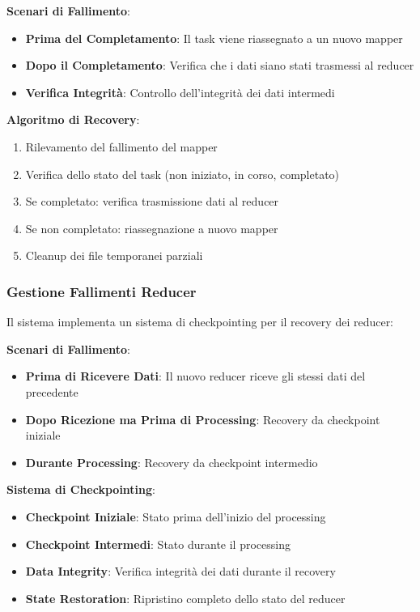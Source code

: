 \documentclass[12pt,a4paper]{article}
\begin{document}
\textbf{Scenari di Fallimento}:
\begin{itemize}
\item \textbf{Prima del Completamento}: Il task viene riassegnato a un nuovo mapper
\item \textbf{Dopo il Completamento}: Verifica che i dati siano stati trasmessi al reducer
\item \textbf{Verifica Integrità}: Controllo dell'integrità dei dati intermedi
\end{itemize}

\textbf{Algoritmo di Recovery}:
\begin{enumerate}
\item Rilevamento del fallimento del mapper
\item Verifica dello stato del task (non iniziato, in corso, completato)
\item Se completato: verifica trasmissione dati al reducer
\item Se non completato: riassegnazione a nuovo mapper
\item Cleanup dei file temporanei parziali
\end{enumerate}

\subsubsection{Gestione Fallimenti Reducer}

Il sistema implementa un sistema di checkpointing per il recovery dei reducer:

\textbf{Scenari di Fallimento}:
\begin{itemize}
\item \textbf{Prima di Ricevere Dati}: Il nuovo reducer riceve gli stessi dati del precedente
\item \textbf{Dopo Ricezione ma Prima di Processing}: Recovery da checkpoint iniziale
\item \textbf{Durante Processing}: Recovery da checkpoint intermedio
\end{itemize}

\textbf{Sistema di Checkpointing}:
\begin{itemize}
\item \textbf{Checkpoint Iniziale}: Stato prima dell'inizio del processing
\item \textbf{Checkpoint Intermedi}: Stato durante il processing
\item \textbf{Data Integrity}: Verifica integrità dei dati durante il recovery
\item \textbf{State Restoration}: Ripristino completo dello stato del reducer
\end{itemize}
\end{document}

